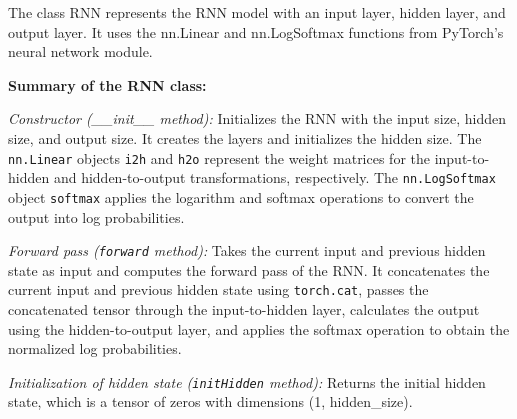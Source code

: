 The class RNN represents the RNN model with an input layer, hidden layer, and output layer. It uses the nn.Linear and nn.LogSoftmax functions from PyTorch's neural network module.

\textbf{Summary of the RNN class:}

\textit{Constructor (\_\_init\_\_ method):} Initializes the RNN with the input size, hidden size, and output size. It creates the layers and initializes the hidden size. The \texttt{nn.Linear} objects \texttt{i2h} and \texttt{h2o} represent the weight matrices for the input-to-hidden and hidden-to-output transformations, respectively. The \texttt{nn.LogSoftmax} object \texttt{softmax} applies the logarithm and softmax operations to convert the output into log probabilities.

\textit{Forward pass (\texttt{forward} method):} Takes the current input and previous hidden state as input and computes the forward pass of the RNN. It concatenates the current input and previous hidden state using \texttt{torch.cat}, passes the concatenated tensor through the input-to-hidden layer, calculates the output using the hidden-to-output layer, and applies the softmax operation to obtain the normalized log probabilities.

\textit{Initialization of hidden state (\texttt{initHidden} method):} Returns the initial hidden state, which is a tensor of zeros with dimensions (1, hidden\_size).

